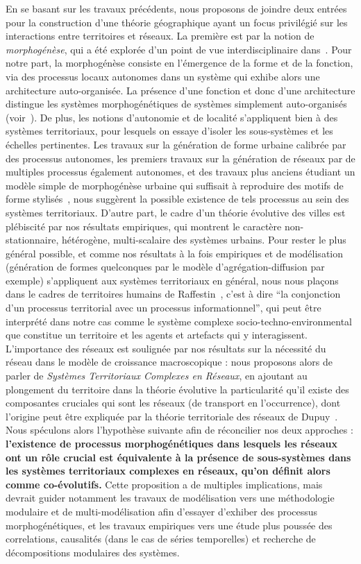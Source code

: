 En se basant sur les travaux précédents, nous proposons de joindre deux entrées pour la construction d'une théorie géographique ayant un focus privilégié sur les interactions entre territoires et réseaux. La première est par la notion de \emph{morphogénèse}, qui a été explorée d'un point de vue interdisciplinaire dans~\cite{antelope2016interdisciplinary}. Pour notre part, la morphogénèse consiste en l'émergence de la forme et de la fonction, via des processus locaux autonomes dans un système qui exhibe alors une architecture auto-organisée. La présence d'une fonction et donc d'une architecture distingue les systèmes morphogénétiques de systèmes simplement auto-organisés (voir~\cite{doursat2012morphogenetic}). De plus, les notions d'autonomie et de localité s'appliquent bien à des systèmes territoriaux, pour lesquels on essaye d'isoler les sous-systèmes et les échelles pertinentes. Les travaux sur la génération de forme urbaine calibrée par des processus autonomes, les premiers travaux sur la génération de réseaux par de multiples processus également autonomes, et des travaux plus anciens étudiant un modèle simple de morphogénèse urbaine qui suffisait à reproduire des motifs de forme stylisés~\cite{raimbault2014hybrid}, nous suggèrent la possible existence de tels processus au sein des systèmes territoriaux. D'autre part, le cadre d'un théorie évolutive des villes est plébiscité par nos résultats empiriques, qui montrent le caractère non-stationnaire, hétérogène, multi-scalaire des systèmes urbains. Pour rester le plus général possible, et comme nos résultats à la fois empiriques et de modélisation (génération de formes quelconques par le modèle d'agrégation-diffusion par exemple) s'appliquent aux systèmes territoriaux en général, nous nous plaçons dans le cadres de territoires humains de Raffestin~\cite{raffestin1988reperes}, c'est à dire ``la conjonction d'un processus territorial avec un processus informationnel'', qui peut être interprété dans notre cas comme le système complexe socio-techno-environmental que constitue un territoire et les agents et artefacts qui y interagissent. L'importance des réseaux est soulignée par nos résultats sur la nécessité du réseau dans le modèle de croissance macroscopique : nous proposons alors de parler de \emph{Systèmes Territoriaux Complexes en Réseaux}, en ajoutant au plongement du territoire dans la théorie évolutive la particularité qu'il existe des composantes cruciales qui sont les réseaux (de transport en l'occurrence), dont l'origine peut être expliquée par la théorie territoriale des réseaux de Dupuy~\cite{dupuy1987vers}. Nous spéculons alors l'hypothèse suivante afin de réconcilier nos deux approches : \textbf{l'existence de processus morphogénétiques dans lesquels les réseaux ont un rôle crucial est équivalente à la présence de sous-systèmes dans les systèmes territoriaux complexes en réseaux, qu'on définit alors comme co-évolutifs.} Cette proposition a de multiples implications, mais devrait guider notamment les travaux de modélisation vers une méthodologie modulaire et de multi-modélisation afin d'essayer d'exhiber des processus morphogénétiques, et les travaux empiriques vers une étude plus poussée des correlations, causalités (dans le cas de séries temporelles) et recherche de décompositions modulaires des systèmes.















